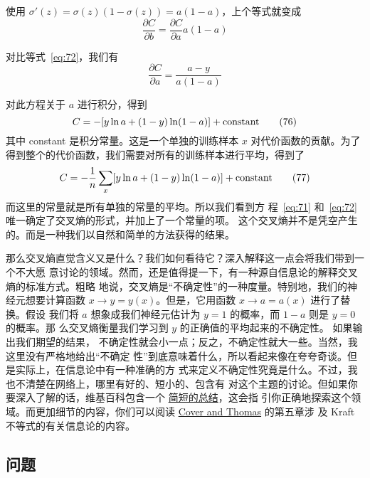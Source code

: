 使用 $\sigma'(z) = \sigma(z)(1-\sigma(z)) = a(1-a)$，上个等式就变成
\begin{equation}
  \frac{\partial C}{\partial b} = \frac{\partial C}{\partial a}
  a(1-a)
  \label{eq:74}\tag{74}
\end{equation}

对比等式~\eqref{eq:72}，我们有
\begin{equation}
  \frac{\partial C}{\partial a} = \frac{a-y}{a(1-a)}
  \label{eq:75}\tag{75}
\end{equation}

对此方程关于 $a$ 进行积分，得到
\begin{equation}
  C = -[y \ln a + (1-y) \ln (1-a)]+ {\rm constant}
  \label{eq:76}\tag{76}
\end{equation}
其中 {\rm constant} 是积分常量。这是一个单独的训练样本 $x$ 对代价函数的贡献。为了
得到整个的代价函数，我们需要对所有的训练样本进行平均，得到了
\begin{equation}
  C = -\frac{1}{n} \sum_x [y \ln a +(1-y) \ln(1-a)] + {\rm constant}
  \label{eq:77}\tag{77}
\end{equation}
而这里的常量就是所有单独的常量的平均。所以我们看到方
程~\eqref{eq:71} 和~\eqref{eq:72} 唯一确定了交叉熵的形式，并加上了一个常量的项。
这个交叉熵并不是凭空产生的。而是一种我们以自然和简单的方法获得的结果。

那么交叉熵直觉含义又是什么？我们如何看待它？深入解释这一点会将我们带到一个不大愿
意讨论的领域。然而，还是值得提一下，有一种源自信息论的解释交叉熵的标准方式。粗略
地说，交叉熵是“不确定性”的一种度量。特别地，我们的神经元想要计算函数 $x
\rightarrow y = y(x)$。但是，它用函数 $x \rightarrow a = a(x)$ 进行了替换。假设
我们将 $a$ 想象成我们神经元估计为 $y = 1$ 的概率，而 $1-a$ 则是 $y=0$ 的概率。那
么交叉熵衡量我们学习到 $y$ 的正确值的平均起来的不确定性。 如果输出我们期望的结果，
不确定性就会小一点；反之，不确定性就大一些。当然，我这里没有严格地给出“不确定
性”到底意味着什么，所以看起来像在夸夸奇谈。但是实际上，在信息论中有一种准确的方
式来定义不确定性究竟是什么。不过，我也不清楚在网络上，哪里有好的、短小的、包含有
对这个主题的讨论。但如果你要深入了解的话，维基百科包含一个%
\href{http://en.wikipedia.org/wiki/Cross_entropy#Motivation}{简短的总结}，这会指
引你正确地探索这个领域。而更加细节的内容，你们可以阅读
\href{http://books.google.ca/books?id=VWq5GG6ycxMC}{Cover and Thomas} 的第五章涉
及 Kraft 不等式的有关信息论的内容。

\subsection*{问题}

